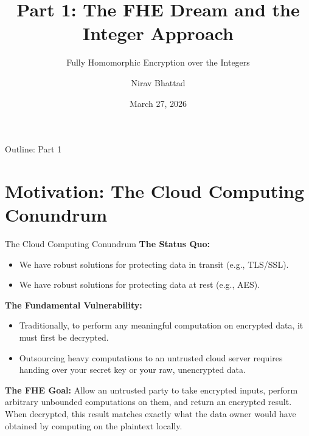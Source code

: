 \documentclass[10pt, aspectratio=169]{beamer}
\title[The FHE Dream]{Part 1: The FHE Dream and the Integer Approach}
\subtitle{Fully Homomorphic Encryption over the Integers}
\author{Nirav Bhattad}
\date{March 27, 2026}
\begin{document}
\frame{\titlepage}

\begin{frame}{Outline: Part 1}
    \tableofcontents
\end{frame}

\section{Motivation: The Cloud Computing Conundrum}
\begin{frame}{The Cloud Computing Conundrum}
    \textbf{The Status Quo:}
    \begin{itemize}
        \item We have robust solutions for protecting data in transit (e.g., TLS/SSL).
        \item We have robust solutions for protecting data at rest (e.g., AES).
    \end{itemize}
    \pause
    
    \vspace{0.3cm}
    \textbf{The Fundamental Vulnerability:}
    \begin{itemize}
        \item Traditionally, to perform any meaningful computation on encrypted data, it must first be decrypted.
        \item Outsourcing heavy computations to an untrusted cloud server requires handing over your secret key or your raw, unencrypted data.
    \end{itemize}
    \pause

    \vspace{0.3cm}
    \textbf{The FHE Goal:}
    Allow an untrusted party to take encrypted inputs, perform arbitrary unbounded computations on them, and return an encrypted result. When decrypted, this result matches exactly what the data owner would have obtained by computing on the plaintext locally.
\end{frame}
\end{document}
